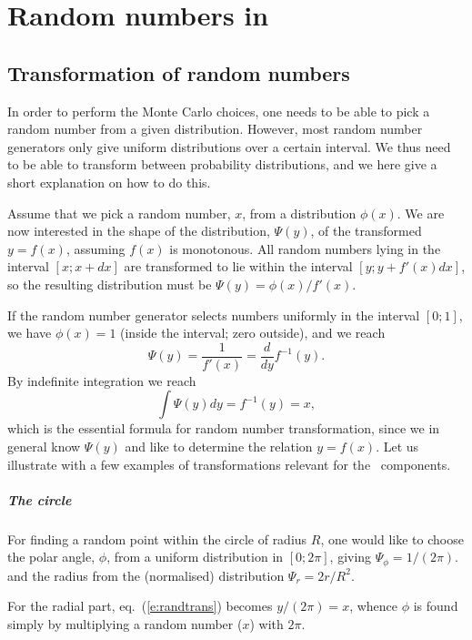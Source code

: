 \chapter{Random numbers in \MCX}
\label{s:random}

\section{Transformation of random numbers}
In order to perform the Monte Carlo choices, one needs to be able to
pick a random number from a given distribution. However, most
random number generators only give
uniform distributions over a certain interval.
We thus need to be able to transform between probability distributions,
and we here give a short explanation on how to do this.

Assume that we pick a random number, $x$, from a distribution $\phi(x)$.
We are now interested in the shape of the distribution, $\Psi(y)$, of the
transformed $y=f(x)$, assuming $f(x)$ is monotonous.
All random numbers lying in the interval $[x; x+dx]$
are transformed to lie within the interval $[y; y+f'(x)dx]$, so the
resulting distribution must be $\Psi(y) = \phi(x) / f'(x)$.

If the random number generator selects numbers uniformly in the interval
$[0; 1]$, we have $\phi(x) = 1$ (inside the interval; zero outside), and
we reach
\begin{equation}
\Psi(y) = \frac{1}{f'(x)} = \frac{d}{dy} f^{-1}(y) .
\end{equation}
By indefinite integration we reach
\begin{equation}
\label{e:randtrans}
\int \Psi(y) dy = f^{-1}(y) = x ,
\end{equation}
which is the essential formula for random number transformation, since we
in general know $\Psi(y)$ and like to determine the relation $y=f(x)$.
Let us illustrate with a few examples of transformations relevant for the
\MCX\ components.

\paragraph{The circle}
For finding a random point within the
circle of radius $R$, one would like to choose the polar angle, $\phi$,
from a uniform
distribution in $[0; 2\pi]$, giving $\Psi_\phi = 1/(2\pi)$.
and the radius from the (normalised) distribution $\Psi_r=2r/R^2$.

For the radial part,
eq.~(\ref{e:randtrans}) becomes $y/(2 \pi) = x$, whence
$\phi$ is found simply by multiplying a random number ($x$)
with $2\pi$.

